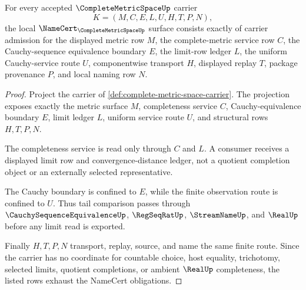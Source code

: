 \begin{theorem}
\label{thm:complete-metric-space-namecert-obligations}
For every accepted $\CompleteMetricSpaceUp$ carrier
$$
K=(M,C,E,L,U,H,T,P,N),
$$
the local $\NameCert_{\CompleteMetricSpaceUp}$ surface consists exactly of carrier admission for the displayed metric row $M$, the complete-metric service row $C$, the Cauchy-sequence equivalence boundary $E$, the limit-row ledger $L$, the uniform Cauchy-service route $U$, componentwise transport $H$, displayed replay $T$, package provenance $P$, and local naming row $N$.
\end{theorem}
\begin{proof}
Project the carrier of \autoref{def:complete-metric-space-carrier}. The projection exposes exactly the metric surface $M$, completeness service $C$, Cauchy-equivalence boundary $E$, limit ledger $L$, uniform service route $U$, and structural rows $H,T,P,N$.

The completeness service is read only through $C$ and $L$. A consumer receives a displayed limit row and convergence-distance ledger, not a quotient completion object or an externally selected representative.

The Cauchy boundary is confined to $E$, while the finite observation route is confined to $U$. Thus tail comparison passes through $\CauchySequenceEquivalenceUp$, $\RegSeqRatUp$, $\StreamNameUp$, and $\RealUp$ before any limit read is exported.

Finally $H,T,P,N$ transport, replay, source, and name the same finite route. Since the carrier has no coordinate for countable choice, host equality, trichotomy, selected limits, quotient completions, or ambient $\RealUp$ completeness, the listed rows exhaust the NameCert obligations.
\end{proof}

